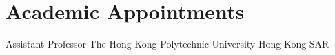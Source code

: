 \section{Academic Appointments}

{Assistant Professor}
{The Hong Kong Polytechnic University}
{}
{Hong Kong SAR}
{}

